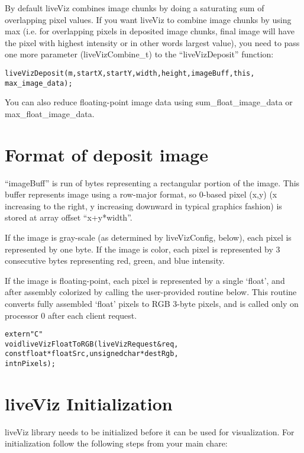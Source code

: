 By default liveViz combines image chunks by doing a saturating sum of 
overlapping pixel values. If you want liveViz to combine image chunks by using 
max (i.e. for overlapping pixels in deposited image chunks, final image will 
have the pixel with highest intensity or in other words largest value), you need
to pass one more parameter (liveVizCombine\_t) to the ``liveVizDeposit'' function:

\begin{alltt}
 liveVizDeposit (m, startX, startY, width, height, imageBuff, this, 
                   max\_image\_data);
\end{alltt}

You can also reduce floating-point image data using
 sum\_float\_image\_data or max\_float\_image\_data.


\section{Format of deposit image}

``imageBuff'' is run of bytes representing a rectangular portion
of the image.  This buffer represents image using a row-major format,
so 0-based pixel (x,y) (x increasing to the right, y increasing downward
in typical graphics fashion) is stored at array offset ``x+y*width''.

If the image is gray-scale (as determined by liveVizConfig, below), each pixel
is represented by one byte.  If the image is color, each pixel is represented
by 3 consecutive bytes representing red, green, and blue intensity.

If the image is floating-point, each pixel is represented by a single
`float', and after assembly colorized by calling the user-provided
routine below.  This routine converts fully assembled `float' pixels 
to RGB 3-byte pixels, and is called only on processor 0 after each
client request.

\begin{alltt}
extern "C"
void liveVizFloatToRGB(liveVizRequest &req, 
        const float *floatSrc, unsigned char *destRgb,
        int nPixels);
\end{alltt}


\section{liveViz Initialization}

liveViz library needs to be initialized before it can be used for 
visualization. For initialization follow the following steps
from your main chare:

